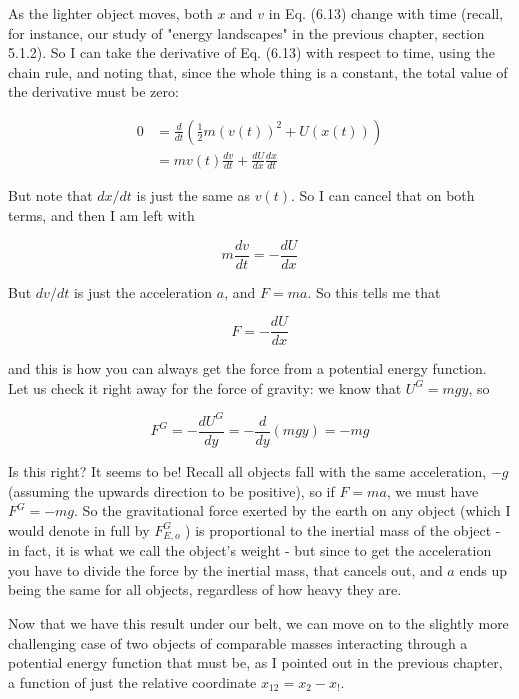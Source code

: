 \documentclass[10pt]{article}
\begin{document}
As the lighter object moves, both $x$ and $v$ in Eq. (6.13) change with time (recall, for instance, our study of "energy landscapes" in the previous chapter, section 5.1.2). So I can take the derivative of Eq. (6.13) with respect to time, using the chain rule, and noting that, since the whole thing is a constant, the total value of the derivative must be zero:


\begin{align*}
0 & =\frac{d}{d t}\left(\frac{1}{2} m(v(t))^{2}+U(x(t))\right) \\
& =m v(t) \frac{d v}{d t}+\frac{d U}{d x} \frac{d x}{d t} \tag{6.14}
\end{align*}


But note that $d x / d t$ is just the same as $v(t)$. So I can cancel that on both terms, and then I am left with


\begin{equation*}
m \frac{d v}{d t}=-\frac{d U}{d x} \tag{6.15}
\end{equation*}


But $d v / d t$ is just the acceleration $a$, and $F=m a$. So this tells me that


\begin{equation*}
F=-\frac{d U}{d x} \tag{6.16}
\end{equation*}


and this is how you can always get the force from a potential energy function.\\
Let us check it right away for the force of gravity: we know that $U^{G}=m g y$, so


\begin{equation*}
F^{G}=-\frac{d U^{G}}{d y}=-\frac{d}{d y}(m g y)=-m g \tag{6.17}
\end{equation*}


Is this right? It seems to be! Recall all objects fall with the same acceleration, $-g$ (assuming the upwards direction to be positive), so if $F=m a$, we must have $F^{G}=-m g$. So the gravitational force exerted by the earth on any object (which I would denote in full by $F_{E, o}^{G}$ ) is proportional to the inertial mass of the object - in fact, it is what we call the object's weight - but since to get the acceleration you have to divide the force by the inertial mass, that cancels out, and $a$ ends up being the same for all objects, regardless of how heavy they are.

Now that we have this result under our belt, we can move on to the slightly more challenging case of two objects of comparable masses interacting through a potential energy function that must be, as I pointed out in the previous chapter, a function of just the relative coordinate $x_{12}=x_{2}-x_{!}$.
\end{document}
